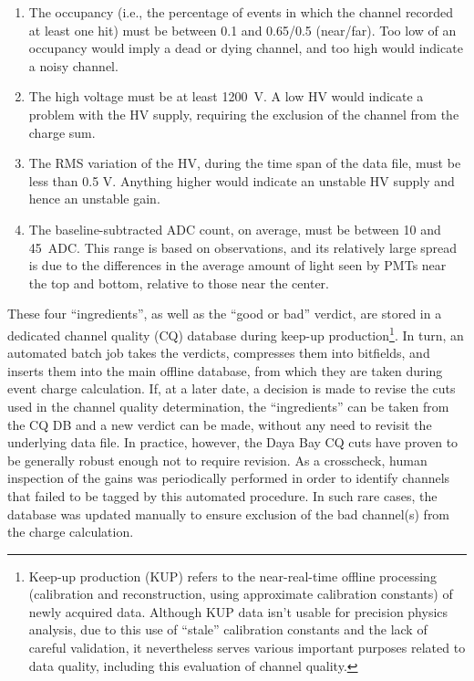 \documentclass[../thesis.tex]{subfiles}
\begin{document}
\begin{enumerate}
\item The occupancy (i.e., the percentage of events in which the channel recorded at least one hit) must be between 0.1 and 0.65/0.5 (near/far). Too low of an occupancy would imply a dead or dying channel, and too high would indicate a noisy channel.
\item The high voltage must be at least 1200~V. A low HV would indicate a problem with the HV supply, requiring the exclusion of the channel from the charge sum.
\item The RMS variation of the HV, during the time span of the data file, must be less than 0.5 V. Anything higher would indicate an unstable HV supply and hence an unstable gain.
\item The baseline-subtracted ADC count, on average, must be between 10 and 45~ADC. This range is based on observations, and its relatively large spread is due to the differences in the average amount of light seen by PMTs near the top and bottom, relative to those near the center.
\end{enumerate}

These four ``ingredients'', as well as the ``good or bad'' verdict, are stored in a dedicated channel quality (CQ) database during keep-up production\footnote{Keep-up production (KUP) refers to the near-real-time offline processing (calibration and reconstruction, using approximate calibration constants) of newly acquired data. Although KUP data isn't usable for precision physics analysis, due to this use of ``stale'' calibration constants and the lack of careful validation, it nevertheless serves various important purposes related to data quality, including this evaluation of channel quality.}. In turn, an automated batch job takes the verdicts, compresses them into bitfields, and inserts them into the main offline database, from which they are taken during event charge calculation. If, at a later date, a decision is made to revise the cuts used in the channel quality determination, the ``ingredients'' can be taken from the CQ DB and a new verdict can be made, without any need to revisit the underlying data file. In practice, however, the Daya Bay CQ cuts have proven to be generally robust enough not to require revision. As a crosscheck, human inspection of the gains was periodically performed in order to identify channels that failed to be tagged by this automated procedure. In such rare cases, the database was updated manually to ensure exclusion of the bad channel(s) from the charge calculation.

\subfilebackmatter
\end{document}
